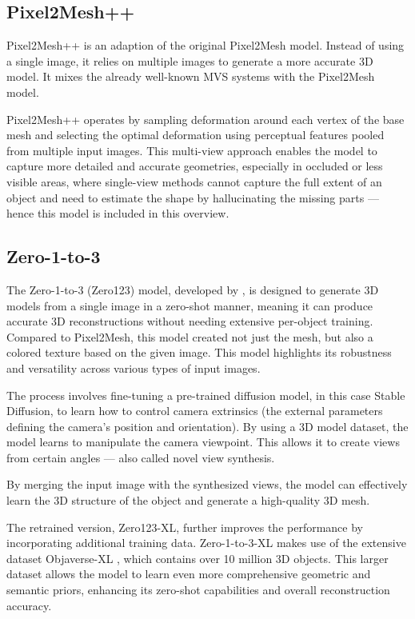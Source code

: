 \subsection{Pixel2Mesh++}
Pixel2Mesh++ \autocite{wen_pixel2mesh_2019} is an adaption of the original Pixel2Mesh model.  Instead of using a single image, it relies on multiple images to generate a more accurate 3D model.
It mixes the already well-known MVS systems with the Pixel2Mesh model.

Pixel2Mesh++ operates by sampling deformation around each vertex of the base mesh and selecting the optimal deformation using perceptual features pooled from multiple input images. This multi-view approach enables the model to capture more detailed and accurate geometries, especially in occluded or less visible areas, where single-view methods cannot capture the full extent of an object and need to estimate the shape by hallucinating the missing parts — hence this model is included in this overview.

\subsection{Zero-1-to-3} \label{section:zero123}
The Zero-1-to-3 (Zero123) model, developed by \textcite{liu_zero-1--3_2023}, is designed to generate 3D models from a single image in a zero-shot manner, meaning it can produce accurate 3D reconstructions without needing extensive per-object training. Compared to Pixel2Mesh, this model created not just the mesh, but also a colored texture based on the given image. This model highlights its robustness and versatility across various types of input images.

The process involves fine-tuning a pre-trained diffusion model, in this case Stable Diffusion, to learn how to control camera extrinsics (the external parameters defining the camera's position and orientation).
By using a 3D model dataset, the model learns to manipulate the camera viewpoint. This allows it to create views from certain angles — also called novel view synthesis.

By merging the input image with the synthesized views, the model can effectively learn the 3D structure of the object and generate a high-quality 3D mesh.

The retrained version, Zero123-XL, further improves the performance by incorporating additional training data. Zero-1-to-3-XL makes use of the extensive dataset Objaverse-XL \autocite{deitke_objaverse-xl_2023}, which contains over 10 million 3D objects.
This larger dataset allows the model to learn even more comprehensive geometric and semantic priors, enhancing its zero-shot capabilities and overall reconstruction accuracy.

